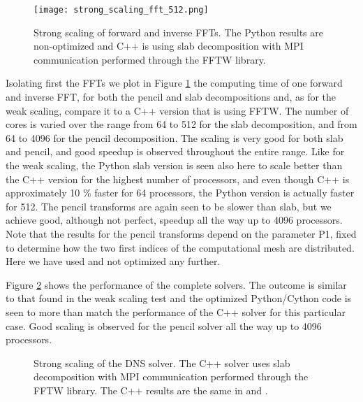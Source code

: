 \documentclass[final,3p,times,twocolumn]{elsarticle}
\begin{document}
\begin{figure}[ht!]
	\centering
	\texttt{[image: strong\_scaling\_fft\_512.png]}
	\caption{Strong scaling of forward and inverse FFTs. The Python results are 
	non-optimized and C++ is using slab 
		decomposition with MPI communication performed through the FFTW 
		library.}
	\label{fig:strong_FFT_scaling}
\end{figure}

Isolating first the FFTs we plot in Figure
\ref{fig:strong_FFT_scaling} the computing time of one forward and inverse FFT, for both the pencil and slab decompositions and, as for the weak scaling, compare it to a C++ version that is using FFTW. The number of
cores is varied over the range from 64 to 512 for the slab
decomposition, and from 64 to 4096 for the
pencil decomposition. The scaling is very good for both slab and pencil, and good speedup is observed
throughout the entire range. Like for the weak scaling, the Python slab version is seen also here to scale better than the C++ version for the highest number of processors, and even though C++ is approximately 10 \% faster for 64 processors, the Python version is actually faster for 512. The pencil transforms are again seen to be slower than slab, but we achieve good, although not perfect, speedup all the way up to 4096 processors. Note that the results for the pencil transforms depend on the parameter P1, fixed to determine how the two first indices of the computational mesh are distributed. Here we have used  and not optimized any further.

Figure \ref{fig:Strong_scaling} shows the performance of the complete solvers. The outcome is similar to that found in the weak scaling test and the optimized Python/Cython code is seen
to more than match the performance of the C++ solver for this particular
case. Good scaling is observed for the pencil solver all the way up to 4096 processors.

\begin{figure}[ht!]
\caption{Strong scaling of the  DNS solver. The C++ solver uses slab decomposition with MPI communication performed through the FFTW library. The C++ results are the same in  and .}
\label{fig:Strong_scaling}
\end{figure}
\end{document}

